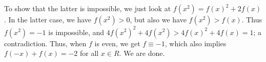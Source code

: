 \documentclass{article}
\begin{document}
\begin{itemize}
    To show that the latter is impossible, we just look at $f(x^2) = f(x)^2 + 2 f(x)$.
    In the latter case, we have $f(x^2) > 0$, but also we have $f(x^2) > f(x)$.
    Thus $f(x^2) = -1$ is impossible, and $4 f(x^2)^2 + 4 f(x^2) > 4 f(x)^2 + 4 f(x) = 1$; a contradiction.
    Thus, when $f$ is even, we get $f \equiv -1$, which also implies $f(-x) + f(x) = -2$ for all $x \in R$.
    We are done.
    
    

\end{itemize}
\end{document}
